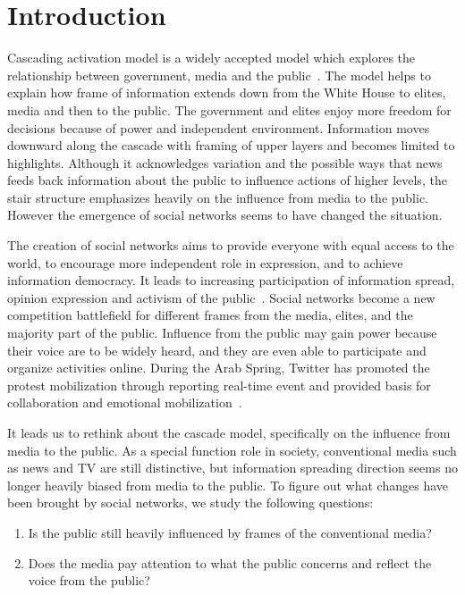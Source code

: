 \section{Introduction}
\label{sec:intro}

Cascading activation model is a widely accepted model which explores the relationship between government, media and the public~\cite{entman1993framing}. The model helps to explain how frame of information extends down from the White House to elites, media and then to the public. The government and elites enjoy more freedom for decisions because of power and independent environment. Information moves downward along the cascade with framing of upper layers and becomes limited to highlights. Although it acknowledges variation and the possible ways that news feeds back information about the public to influence actions of higher levels, the stair structure emphasizes heavily on the influence from media to the public. However the emergence of social networks seems to have changed the situation.

The creation of social networks aims to provide everyone with equal access to the world, to encourage more independent role in expression, and to achieve information democracy. It leads to increasing participation of information spread, opinion expression and activism of the public~\cite{gonzalez2011dynamics,tufekci2012social}. Social networks become a new competition battlefield for different frames from the media, elites, and the majority part of the public. Influence from the public may gain power because their voice are to be widely heard, and they are even able to participate and organize activities online. During the Arab Spring, Twitter has promoted the protest mobilization through reporting real-time event and provided basis for collaboration and emotional mobilization~\cite{breuer2014social}.

It leads us to rethink about the cascade model, specifically on the influence from media to the public. As a special function role in society, conventional media such as news and TV are still distinctive, but information spreading direction seems no longer heavily biased from media to the public. To figure out what changes have been brought by social networks, we study the following questions:

\begin{enumerate}
\item Is the public still heavily influenced by frames of the conventional media?
\item Does the media pay attention to what the public concerns and reflect the voice from the public?
\end{enumerate}

